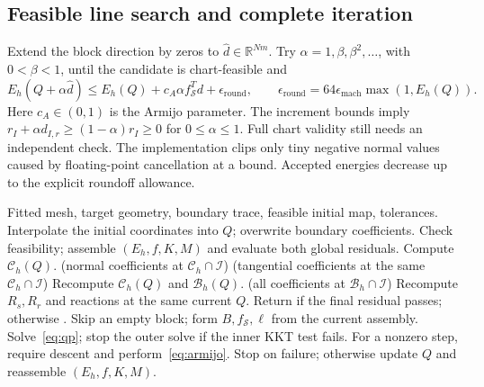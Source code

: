 \documentclass[11pt,a4paper]{article}
\newcommand{\R}{\mathbb R}
\newcommand{\code}[1]{\texttt{\detokenize{#1}}}
\newcommand{\free}{\mathcal I}
\newcommand{\collar}{\mathcal C_h}
\newcommand{\bulk}{\mathcal B_h}
\begin{document}
\subsection{Feasible line search and complete iteration}
Extend the block direction by zeros to \(\widehat d\in\R^{Nm}\).
Try \(\alpha=1,\beta,\beta^2,\ldots\), with \(0<\beta<1\), until
the candidate is chart-feasible and
\begin{equation}
 E_h(Q+\alpha\widehat d)
 \leq E_h(Q)+c_A\alpha f_{\mathcal S}^Td+\epsilon_{\mathrm{round}},
 \qquad
 \epsilon_{\mathrm{round}}=64\epsilon_{\mathrm{mach}}\max(1,E_h(Q)).
 \label{eq:armijo}
\end{equation}
Here \(c_A\in(0,1)\) is the Armijo parameter. The increment bounds imply
\(r_I+\alpha d_{I,r}\geq(1-\alpha)r_I\geq0\) for
\(0\leq\alpha\leq1\). Full chart validity still needs an independent check.
The implementation clips only tiny negative normal values caused by
floating-point cancellation at a bound. Accepted energies decrease up to
the explicit roundoff allowance.

\begin{algorithm}[htbp]
\caption{The implemented obstacle-map cycle}
\label{alg:outer}
\begin{algorithmic}[1]
\Require Fitted mesh, target geometry, boundary trace, feasible initial map, tolerances.
\State Interpolate the initial coordinates into \(Q\); overwrite boundary coefficients.
\State Check feasibility; assemble \((E_h,f,K,M)\) and evaluate both global residuals.
    \State \Return \code{CONVERGED}
  \EndIf
  \State Compute \(\collar(Q)\).
  \State {}(normal coefficients at \(\collar\cap\free\))
  \State {}(tangential coefficients at the same \(\collar\cap\free\))
    \State Recompute \(\collar(Q)\) and \(\bulk(Q)\).
    \State {}(all coefficients at \(\bulk\cap\free\))
  \EndFor
  \State Recompute \(R_s,R_r\) and reactions at the same current \(Q\).
\EndFor
\State Return \code{CONVERGED} if the final residual passes; otherwise \code{MAX_ITERATIONS}.
  \State Skip an empty block; form \(B,f_{\mathcal S},\ell\) from the current assembly.
  \State Solve~\eqref{eq:qp}; stop the outer solve if the inner KKT test fails.
  \State For a nonzero step, require descent and perform~\eqref{eq:armijo}.
  \State Stop on failure; otherwise update \(Q\) and reassemble \((E_h,f,K,M)\).
\EndProcedure
\end{algorithmic}
\end{algorithm}
\end{document}
